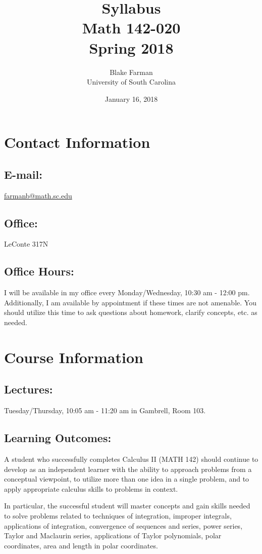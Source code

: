 \documentclass[10pt]{amsart}
\author[Blake Farman]{Blake Farman\\University of South Carolina}
\title[Math 142-020]{Syllabus\\Math 142-020\\Spring 2018}
\date{January 16, 2018}
\begin{document}
\maketitle

\section*{Contact Information}
\noindent
\subsection*{E-mail:} \href{mailto:farmanb@math.sc.edu}{farmanb@math.sc.edu}
\subsection*{Office:} LeConte 317N
\subsection*{Office Hours:}
I will be available in my office every Monday/Wednesday, 10:30 am - 12:00 pm.
Additionally, I am available by appointment if these times are not amenable.
You should utilize this time to ask questions about homework, clarify concepts, etc. as needed.

\section*{Course Information}
\noindent
\subsection*{Lectures:}
Tuesday/Thursday,  10:05 am - 11:20 am in Gambrell, Room 103.

\subsection*{Learning Outcomes:} A student who successfully completes Calculus II (MATH 142) should continue to develop as an independent learner 
  with the ability to approach problems from a conceptual viewpoint, to utilize more than one idea in a single problem, and to apply appropriate 
  calculus skills to problems in context.
  
  In particular, the successful student will master concepts and gain skills needed to solve problems related to 
  techniques of integration, 
  improper integrals, 
  applications of integration, 
  convergence of sequences and series,
  power series,
  Taylor and Maclaurin series,
  applications of Taylor polynomials,
  polar coordinates,
  area and length in polar coordinates.\\
\end{document}
